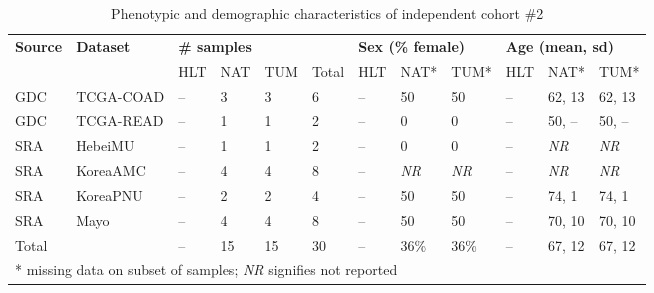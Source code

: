 \begin{table}[ht]
    \small
    \centering
    \caption{Phenotypic and demographic characteristics of independent cohort \#2}
    \label{tab:ind2}
    \begin{tabular}{ll|llll|lll|lll}
        \textbf{Source} & \textbf{Dataset} & \multicolumn{4}{l|}{\textbf{\# samples}} & \multicolumn{3}{l|}{\textbf{Sex (\% female)}} & \multicolumn{3}{l}{\textbf{Age (mean, sd)}} \\
        \cline{3-12}
         & & HLT & NAT & TUM & Total & HLT & NAT* & TUM* & HLT & NAT* & TUM* \\
        \hline
        GDC & TCGA-COAD & -- & 3 & 3 & 6 & -- & 50 & 50 & -- & 62, 13 & 62, 13 \\
        GDC & TCGA-READ & -- & 1 & 1 & 2 & -- & 0 & 0 & -- & 50, -- & 50, -- \\
        SRA & HebeiMU & -- & 1 & 1 & 2 & -- & 0 & 0 & -- & \emph{NR} & \emph{NR} \\
        SRA & KoreaAMC & -- & 4 & 4 & 8 & -- & \emph{NR} & \emph{NR} & -- & \emph{NR} & \emph{NR} \\
        SRA & KoreaPNU & -- & 2 & 2 & 4 & -- & 50 & 50 & -- & 74, 1 & 74, 1 \\
        SRA & Mayo & -- & 4 & 4 & 8 & -- & 50 & 50 & -- & 70, 10 & 70, 10 \\
        \hline
        Total &  & -- & 15 & 15 & 30 & -- & 36\% & 36\% & -- & 67, 12 & 67, 12 \\
        \hline
        \multicolumn{12}{l}{* missing data on subset of samples; \emph{NR} signifies not reported} \\
    \end{tabular}
\end{table}
